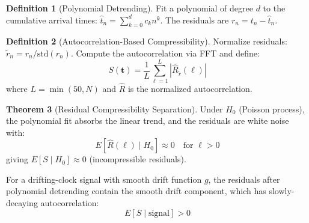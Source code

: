 \documentclass[11pt]{article}
\theoremstyle{definition}
\newtheorem{theorem}{Theorem}[section]
\newtheorem{definition}[theorem]{Definition}
\begin{document}
\begin{definition}[Polynomial Detrending]
Fit a polynomial of degree $d$ to the cumulative arrival times: $\hat{t}_n = \sum_{k=0}^{d} c_k n^k$. The residuals are $r_n = t_n - \hat{t}_n$.
\end{definition}

\begin{definition}[Autocorrelation-Based Compressibility]
Normalize residuals: $\tilde{r}_n = r_n / \mathrm{std}(r_n)$. Compute the autocorrelation via FFT and define:
\begin{equation}
S(\mathbf{t}) = \frac{1}{L} \sum_{\ell=1}^{L} |\hat{R}_{\tilde{r}}(\ell)|
\end{equation}
where $L = \min(50, N)$ and $\hat{R}$ is the normalized autocorrelation.
\end{definition}

\begin{theorem}[Residual Compressibility Separation]
\label{thm:variable}
Under $H_0$ (Poisson process), the polynomial fit absorbs the linear trend, and the residuals are white noise with:
\begin{equation}
E[\hat{R}(\ell) \mid H_0] \approx 0 \quad \text{for } \ell > 0
\end{equation}
giving $E[S \mid H_0] \approx 0$ (incompressible residuals).

For a drifting-clock signal with smooth drift function $g$, the residuals after polynomial detrending contain the smooth drift component, which has slowly-decaying autocorrelation:
\begin{equation}
E[S \mid \text{signal}] > 0
\end{equation}
\end{theorem}
\end{document}
